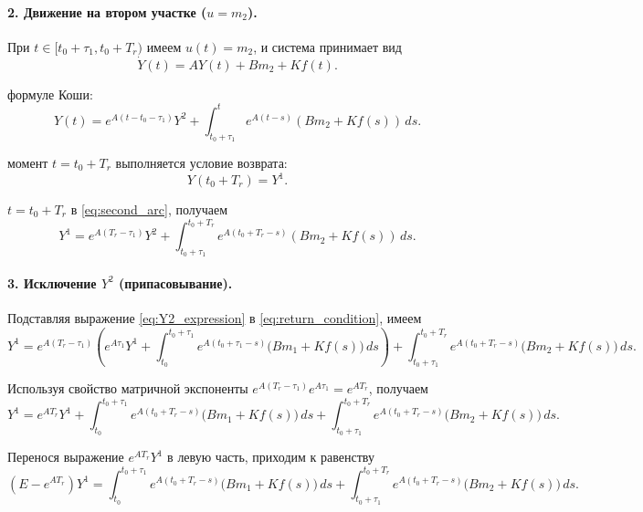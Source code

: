 \documentclass[12pt,a4paper]{article}
\theoremstyle{bigplain}
\theoremstyle{plain}
\begin{document}
\paragraph{2. Движение на втором участке ($u=m_2$).}

При $t\in[t_0+\tau_1,t_0+T_r)$ имеем $u(t)=m_2$, и система принимает вид
\[
\dot Y(t)=AY(t)+Bm_2+Kf(t).
\]

 формуле Коши:
\begin{equation}
Y(t)
=
e^{A(t-t_0-\tau_1)}Y^{2}
+
\int_{t_0+\tau_1}^{t}
e^{A(t-s)}(Bm_2+Kf(s))\,ds.
\tag{1.5}
\label{eq:second_arc}
\end{equation}

 момент $t=t_0+T_r$ выполняется условие возврата:
\[
Y(t_0+T_r)=Y^{1}.
\]

 $t=t_0+T_r$ в \eqref{eq:second_arc}, получаем
\begin{equation}
Y^{1}
=
e^{A(T_r-\tau_1)}Y^{2}
+
\int_{t_0+\tau_1}^{t_0+T_r}
e^{A(t_0+T_r-s)}(Bm_2+Kf(s))\,ds.
\tag{1.6}
\label{eq:return_condition}
\end{equation}


\paragraph{3. Исключение $Y^{2}$ (припасовывание).}

Подставляя выражение \eqref{eq:Y2_expression} в
\eqref{eq:return_condition}, имеем
\begin{equation*}
Y^{1}=
e^{A(T_r-\tau_1)}
\left(
e^{A\tau_1}Y^{1}
+
\int_{t_0}^{t_0+\tau_1}
e^{A(t_0+\tau_1-s)}
\bigl(Bm_1+Kf(s)\bigr)\,ds
\right)
+
\int_{t_0+\tau_1}^{t_0+T_r}
e^{A(t_0+T_r-s)}
\bigl(Bm_2+Kf(s)\bigr)\,ds.
\end{equation*}

\noindent Используя свойство матричной экспоненты
$e^{A(T_r-\tau_1)}e^{A\tau_1}=e^{AT_r}$, получаем
\begin{equation*}
Y^{1}=
e^{AT_r}Y^{1}
+
\int_{t_0}^{t_0+\tau_1}
e^{A(t_0+T_r-s)}
\bigl(Bm_1+Kf(s)\bigr)\,ds
+
\int_{t_0+\tau_1}^{t_0+T_r}
e^{A(t_0+T_r-s)}
\bigl(Bm_2+Kf(s)\bigr)\,ds.
\end{equation*}

\noindent Перенося выражение $e^{AT_r}Y^{1}$ в левую часть, приходим к равенству
\begin{equation}
(E-e^{AT_r})Y^{1}
=
\int_{t_0}^{t_0+\tau_1}
e^{A(t_0+T_r-s)}
\bigl(Bm_1+Kf(s)\bigr)\,ds
+
\int_{t_0+\tau_1}^{t_0+T_r}
e^{A(t_0+T_r-s)}
\bigl(Bm_2+Kf(s)\bigr)\,ds.
\tag{1.7}
\label{eq:Y1_matching}
\end{equation}
\end{document}
